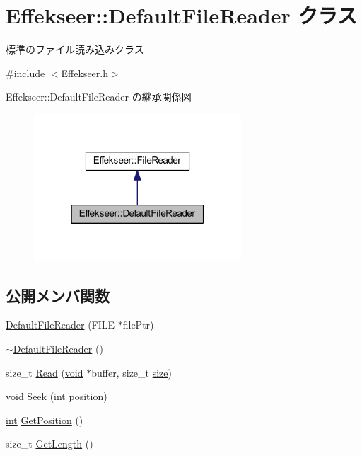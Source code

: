 \hypertarget{class_effekseer_1_1_default_file_reader}{}\section{Effekseer\+:\+:Default\+File\+Reader クラス}
\label{class_effekseer_1_1_default_file_reader}


標準のファイル読み込みクラス  




{\ttfamily \#include $<$Effekseer.\+h$>$}



Effekseer\+:\+:Default\+File\+Reader の継承関係図\nopagebreak
\begin{figure}[H]
\begin{center}
\leavevmode
\includegraphics[width=220pt]{class_effekseer_1_1_default_file_reader__inherit__graph}
\end{center}
\end{figure}
\subsection*{公開メンバ関数}
\begin{DoxyCompactItemize}
\item 
\mbox{\hyperlink{class_effekseer_1_1_default_file_reader_ad8f7324f6217658c9f3ec1c6db5f9e6b}{Default\+File\+Reader}} (F\+I\+LE $\ast$file\+Ptr)
\item 
\mbox{\hyperlink{class_effekseer_1_1_default_file_reader_adcc437133a5e54acf884fd867d243c96}{$\sim$\+Default\+File\+Reader}} ()
\item 
size\+\_\+t \mbox{\hyperlink{class_effekseer_1_1_default_file_reader_ae00fd8b1031e13bd5a43d74f03d7ed79}{Read}} (\mbox{\hyperlink{namespace_effekseer_ab34c4088e512200cf4c2716f168deb56}{void}} $\ast$buffer, size\+\_\+t \mbox{\hyperlink{namespace_effekseer_a73c68f3d33539d30844b9d1e058077f7}{size}})
\item 
\mbox{\hyperlink{namespace_effekseer_ab34c4088e512200cf4c2716f168deb56}{void}} \mbox{\hyperlink{class_effekseer_1_1_default_file_reader_a9c9e821e4508708a2c91a9ab486b2709}{Seek}} (\mbox{\hyperlink{namespace_effekseer_ace0abf7c2e6947e519ebe8b54cbcc30a}{int}} position)
\item 
\mbox{\hyperlink{namespace_effekseer_ace0abf7c2e6947e519ebe8b54cbcc30a}{int}} \mbox{\hyperlink{class_effekseer_1_1_default_file_reader_a86001f21782b7cb40a5e0ca4ee155aca}{Get\+Position}} ()
\item 
size\+\_\+t \mbox{\hyperlink{class_effekseer_1_1_default_file_reader_a2663a6f3b6bf3aaabadcfe371a85b15d}{Get\+Length}} ()
\end{DoxyCompactItemize}
